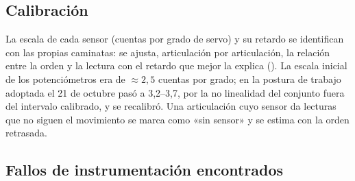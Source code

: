 \subsection{Calibración}

La escala de cada sensor (cuentas por grado de servo) y su retardo se
identifican con las propias caminatas: se ajusta, articulación por
articulación, la relación entre la orden y la lectura con el retardo que mejor la
explica (). La escala inicial de los
potenciómetros era de $\approx2{,}5$ cuentas por grado; en la postura de
trabajo adoptada el 21 de octubre pasó a 3,2--3,7, por la no linealidad del
conjunto fuera del intervalo calibrado, y se recalibró. Una articulación cuyo
sensor da lecturas que no siguen el movimiento se marca como «sin sensor» y se
estima con la orden retrasada.

\subsection{Fallos de instrumentación encontrados}

